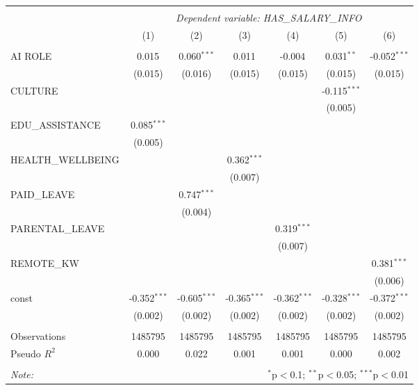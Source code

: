 \begin{table}[!htbp] \centering
\begin{tabular}{@{\extracolsep{5pt}}lcccccc}
\\[-1.8ex]\hline
\hline \\[-1.8ex]
& \multicolumn{6}{c}{\textit{Dependent variable: HAS_SALARY_INFO}} \
\cr \cline{2-7}
\\[-1.8ex] & (1) & (2) & (3) & (4) & (5) & (6) \\
\hline \\[-1.8ex]
 AI ROLE & 0.015$^{}$ & 0.060$^{***}$ & 0.011$^{}$ & -0.004$^{}$ & 0.031$^{**}$ & -0.052$^{***}$ \\
& (0.015) & (0.016) & (0.015) & (0.015) & (0.015) & (0.015) \\
 CULTURE & & & & & -0.115$^{***}$ & \\
& & & & & (0.005) & \\
 EDU_ASSISTANCE & 0.085$^{***}$ & & & & & \\
& (0.005) & & & & & \\
 HEALTH_WELLBEING & & & 0.362$^{***}$ & & & \\
& & & (0.007) & & & \\
 PAID_LEAVE & & 0.747$^{***}$ & & & & \\
& & (0.004) & & & & \\
 PARENTAL_LEAVE & & & & 0.319$^{***}$ & & \\
& & & & (0.007) & & \\
 REMOTE_KW & & & & & & 0.381$^{***}$ \\
& & & & & & (0.006) \\
 const & -0.352$^{***}$ & -0.605$^{***}$ & -0.365$^{***}$ & -0.362$^{***}$ & -0.328$^{***}$ & -0.372$^{***}$ \\
& (0.002) & (0.002) & (0.002) & (0.002) & (0.002) & (0.002) \\
\hline \\[-1.8ex]
 Observations & 1485795 & 1485795 & 1485795 & 1485795 & 1485795 & 1485795 \\
 Pseudo $R^2$ & 0.000 & 0.022 & 0.001 & 0.001 & 0.000 & 0.002 \\
\hline
\hline \\[-1.8ex]
\textit{Note:} & \multicolumn{6}{r}{$^{*}$p$<$0.1; $^{**}$p$<$0.05; $^{***}$p$<$0.01} \\
\end{tabular}
\end{table}